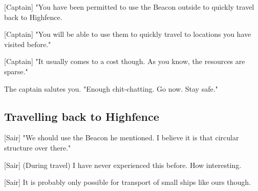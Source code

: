 \documentclass[a4paper,12pt]{article}
\begin{document}
[Captain] "You have been permitted to use the Beacon outside to quickly travel back to Highfence. 

[Captain] "You will be able to use them to quickly travel to locations you have visited before." 

[Captain] "It usually comes to a cost though. As you know, the resources are sparse."

The captain salutes you. "Enough chit-chatting. Go now. Stay safe."

\subsection{Travelling back to Highfence}

[Sair] "We should use the Beacon he mentioned. I believe it is that circular
structure over there."

[Sair] (During travel) I have never experienced this before. How interesting.

[Sair] It is probably only possible for transport of small ships like ours though.
\end{document}
